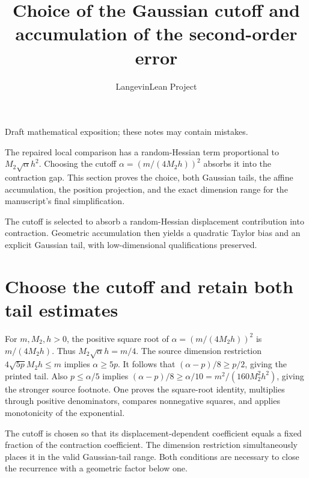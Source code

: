 \documentclass[11pt,a4paper]{article}
\title{\texorpdfstring{Choice of the Gaussian cutoff and accumulation of the second-order error}{Choice of the Gaussian cutoff and accumulation of the second-order error}}
\author{LangevinLean Project}
\date{}
\begin{document}
\maketitle
Draft mathematical exposition; these notes may contain mistakes.


The repaired local comparison has a random-Hessian term proportional to \(M_2\sqrt\alpha h^2\). Choosing the cutoff \(\alpha=(m/(4M_2h))^2\) absorbs it into the contraction gap. This section proves the choice, both Gaussian tails, the affine accumulation, the position projection, and the exact dimension range for the manuscript’s final simplification.



The cutoff is selected to absorb a random-Hessian displacement contribution into contraction. Geometric accumulation then yields a quadratic Taylor bias and an explicit Gaussian tail, with low-dimensional qualifications preserved.


\section{\texorpdfstring{Choose the cutoff and retain both tail estimates}{Choose the cutoff and retain both tail estimates}}


For \(m,M_2,h>0\), the positive square root of \(\alpha=(m/(4M_2h))^2\) is \(m/(4M_2h)\). Thus \(M_2\sqrt\alpha h=m/4\). The source dimension restriction \(4\sqrt{5p}M_2h\le m\) implies \(\alpha\ge5p\). It follows that \((\alpha-p)/8\ge p/2\), giving the printed tail. Also \(p\le\alpha/5\) implies \((\alpha-p)/8\ge\alpha/10=m^2/(160M_2^2h^2)\), giving the stronger source footnote. One proves the square-root identity, multiplies through positive denominators, compares nonnegative squares, and applies monotonicity of the exponential.



The cutoff is chosen so that its displacement-dependent coefficient equals a fixed fraction of the contraction coefficient. The dimension restriction simultaneously places it in the valid Gaussian-tail range. Both conditions are necessary to close the recurrence with a geometric factor below one.
\end{document}
